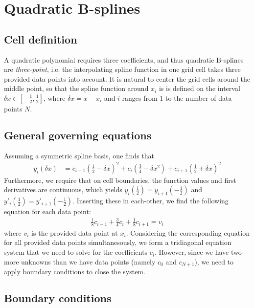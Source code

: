 \documentclass{article}
\begin{document}
\section{Quadratic B-splines}

\subsection{Cell definition}
A quadratic polynomial requires three coefficients, and thus quadratic B-splines are \emph{three-point}, i.e. the interpolating spline function in one grid cell takes three provided data points into account. It is natural to center the grid cells around the middle point, so that the spline function around $x_i$ is is defined on the interval $\delta x \in [-\frac{1}{2}, \frac{1}{2}]$, where $\delta x = x - x_i$ and $i$ ranges from $1$ to the number of data points $N$.

\subsection{General governing equations}

Assuming a symmetric spline basis, one finds that 
\begin{align}
\label{bspline-quadratic-yi}
y_i(\delta x) &= c_{i-1}\left(\tfrac{1}{2} - \delta x\right)^{2} + c_{i}\left(\tfrac{3}{4} - \delta x^{2}\right) + c_{i+1}\left(\tfrac{1}{2} + \delta x\right)^{2}
\end{align}
Furthermore, we require that on cell boundaries, the function values and first derivatives are continuous, which yields $y_{i}(\frac{1}{2}) = y_{i+1}(-\frac{1}{2})$ and $y'_{i}(\frac{1}{2}) = y'_{i+1}(-\frac{1}{2})$. Inserting these in each-other, we find the following equation for each data point:
\begin{align*}\frac{1}{8} c_{i-1} + \frac{3}{4} c_{i} + \frac{1}{8} c_{i+1} = v_i\end{align*}
where $v_{i}$ is the provided data point at $x_{i}$. Considering the corresponding equation for all provided data points simultanesously, we form a tridiagonal equation system that we need to solve for the coefficients $c_{i}$. However, since we have two more unknowns than we have data points (namely $c_{0}$ and $c_{N+1}$), we need to apply boundary conditions to close the system.

\subsection{Boundary conditions}
\end{document}
